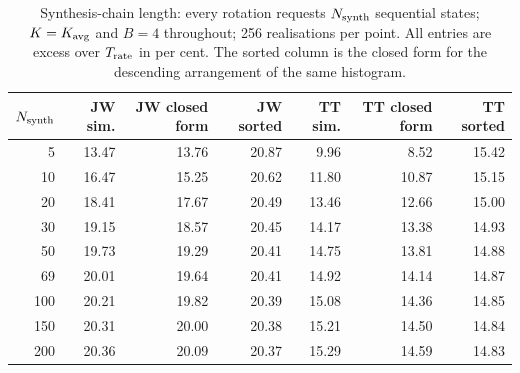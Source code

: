 \begin{table}[htbp]
\centering\footnotesize
\begin{tabular}{rrrrrrr}
\toprule
$N_{\rm synth}$ & JW sim. & JW closed form & JW sorted & TT sim. & TT closed form & TT sorted\\\midrule
5 & 13.47 & 13.76 & 20.87 & 9.96 & 8.52 & 15.42\\
10 & 16.47 & 15.25 & 20.62 & 11.80 & 10.87 & 15.15\\
20 & 18.41 & 17.67 & 20.49 & 13.46 & 12.66 & 15.00\\
30 & 19.15 & 18.57 & 20.45 & 14.17 & 13.38 & 14.93\\
50 & 19.73 & 19.29 & 20.41 & 14.75 & 13.81 & 14.88\\
69 & 20.01 & 19.64 & 20.41 & 14.92 & 14.14 & 14.87\\
100 & 20.21 & 19.82 & 20.39 & 15.08 & 14.36 & 14.85\\
150 & 20.31 & 20.00 & 20.38 & 15.21 & 14.50 & 14.84\\
200 & 20.36 & 20.09 & 20.37 & 15.29 & 14.59 & 14.83\\
\bottomrule
\end{tabular}
\caption{Synthesis-chain length: every rotation requests $N_{\rm synth}$ sequential states; $K=K_{\rm avg}$ and $B=4$ throughout; 256 realisations per point. All entries are excess over $T_{\rm rate}$ in per cent. The sorted column is the closed form for the descending arrangement of the same histogram.}
\label{tab:budget}
\end{table}
